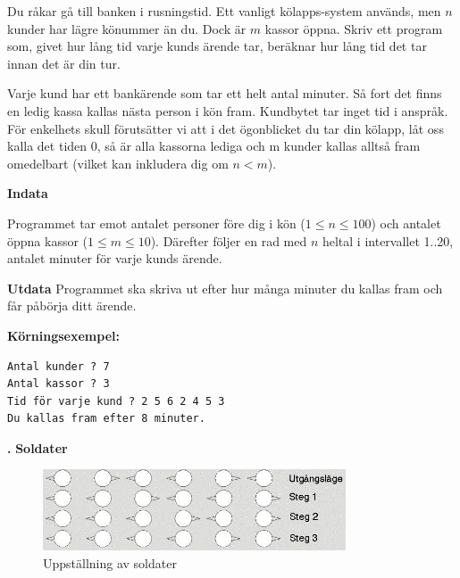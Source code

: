 \documentclass[a4paper,12pt]{article}
\newcounter{iii}\setcounter{iii}{0}
\def\i{\bigskip\noindent\refstepcounter{iii}\textbf{\arabic{iii}.} }
\begin{document}
Du råkar gå till banken i rusningstid. Ett vanligt kölapps-system används, men $n$ kunder har lägre könummer än du. Dock är $m$ kassor öppna. Skriv ett program som, givet hur lång tid varje kunds ärende tar, beräknar hur lång tid det tar innan det är din tur.

Varje kund har ett bankärende som tar ett helt antal minuter. Så fort det finns en ledig kassa kallas nästa person i kön fram. Kundbytet tar inget tid i anspråk. För enkelhets skull förutsätter vi att i det ögonblicket du tar din kölapp, låt oss kalla det tiden 0, så är alla kassorna lediga och m kunder kallas alltså fram omedelbart (vilket kan inkludera dig om $n < m$).

\textbf{Indata}

Programmet tar emot antalet personer före dig i kön ($1 \le n \le 100$) och antalet öppna kassor ($1 \le m \le 10$). Därefter följer en rad med $n$ heltal i intervallet 1..20, antalet minuter för varje kunds ärende. 

\textbf{Utdata}
Programmet ska skriva ut efter hur många minuter du kallas fram och får påbörja ditt ärende.


\textbf{Körningsexempel:}
\begin{lstlisting}
Antal kunder ? 7
Antal kassor ? 3
Tid för varje kund ? 2 5 6 2 4 5 3
Du kallas fram efter 8 minuter.
\end{lstlisting}

\i \textbf{Soldater}

\begin{figure}[!ht]
\centering
\includegraphics[width=0.8\textwidth]{soldater.jpg}
\caption{Uppställning av soldater}
\label{fig:soldater}
\end{figure}
\end{document}
